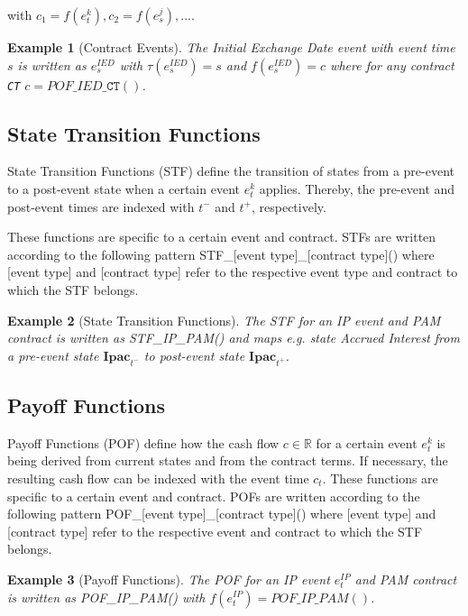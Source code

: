 \documentclass[9pt,oneside]{amsart}
\newtheorem{example}{Example}
\newcommand{\Real}{\mathbb{R}}
\newcommand{\svar}[2]{\textbf{#1}_{#2}}
\newcommand{\attr}[1]{\texttt{#1}}
\newcommand{\stf}[2]{STF\_#1\_#2()}
\newcommand{\pof}[2]{POF\_#1\_#2()}
\newcommand{\tev}[1]{\tau(#1)}
\newcommand{\fev}[1]{f(#1)}
\begin{document}
\begin{multicols}{2}
with $c_1=\fev{e_t^k}, c_2=\fev{e_s^j}, ...$.

\begin{example}[Contract Events]
The \textit{Initial Exchange Date} event with event time $s$ is written as $e_s^{IED}$ with $\tev{e_s^{IED}}=s$ and $\fev{e_s^{IED}}=c$ where for any contract \attr{CT} $c=\pof{IED}{\attr{CT}}$.
\end{example}


\subsection{State Transition Functions}\label{sec:stf}

State Transition Functions (STF) define the transition of states from a pre-event to a post-event state when a certain event $e_t^{k}$ applies. Thereby, the pre-event and post-event times are indexed with $t^-$ and $t^+$, respectively. 

These functions are specific to a certain event and contract. STFs are written according to the following pattern \stf{[event type]}{[contract type]} where [event type] and [contract type] refer to the respective event type and contract to which the STF belongs.

\begin{example}[State Transition Functions]
The STF for an IP event and PAM contract is written as \stf{IP}{PAM} and maps e.g. state \textit{Accrued Interest} from a pre-event state $\svar{Ipac}{t^-}$ to post-event state $\svar{Ipac}{t^+}$.
\end{example}


\subsection{Payoff Functions}\label{sec:pof}

Payoff Functions (POF) define how the cash flow $c\in\Real$ for a certain event $e_t^k$ is being derived from current states and from the contract terms. If necessary, the resulting cash flow can be indexed with the event time $c_t$. These functions are specific to a certain event and contract. POFs are written according to the following pattern \pof{[event type]}{[contract type]} where [event type] and [contract type] refer to the respective event and contract to which the STF belongs.

\begin{example}[Payoff Functions]
The POF for an IP event $e_t^{IP}$ and PAM contract is written as \pof{IP}{PAM} with $\fev{e_t^{IP}}=\pof{IP}{PAM}$.
\end{example}



\end{multicols}
\end{document}
